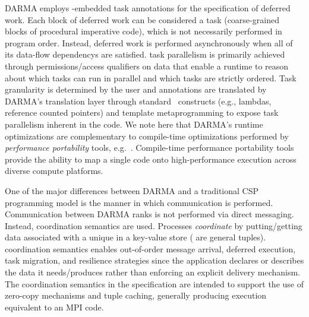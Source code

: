 \gls{DARMA} employs \CC-embedded task annotations for the specification of \gls{deferred
work}. Each block of \gls{deferred work} can be considered a task (coarse-grained blocks of 
\gls{procedural} \gls{imperative} code),  which is not necessarily performed in program order.   Instead,
\gls{deferred work} is performed asynchronously when all of its \glspl{data-flow dependency} are
satisfied.  \Gls{task parallelism} is primarily achieved through permissions/access qualifiers
on data that enable a runtime to reason about which tasks can run in parallel and which tasks are strictly ordered.
Task granularity is determined by the user and annotations are translated by \gls{DARMA}'s \gls{translation
layer} through standard \CC\ constructs (e.g., \glspl{lambda}, \glspl{reference counted pointer}) and \gls{template metaprogramming} to
expose \gls{task parallelism} inherent in the code.
We note here that \gls{DARMA}'s runtime optimizations are complementary to
compile-time optimizations performed by \emph{performance
portability} tools, e.g.~\cite{Kokkos,RAJA,TIDA}.  Compile-time performance
portability tools provide the ability to map a
single code onto high-performance execution across diverse compute platforms.


One of the major differences between \gls{DARMA} and a traditional \gls{CSP}
\gls{programming model} is the manner in which communication is performed.  
Communication between \gls{DARMA} \glspl{rank} is not performed via direct messaging.
Instead, \gls{coordination semantics} are used.  Processes \emph{coordinate} by putting/getting
data associated with a unique  in a \gls{key-value store}
( are general \glspl{tuple}).  
\Gls{coordination semantics} enables out-of-order message arrival, deferred
execution, task migration, and resilience strategies 
since the application declares or describes the data it needs/produces rather than enforcing an explicit delivery mechanism.
The \gls{coordination semantics} in the specification are intended to support
the use of \gls{zero-copy} mechanisms and \gls{tuple} caching,
generally producing execution equivalent to an MPI  code. 

